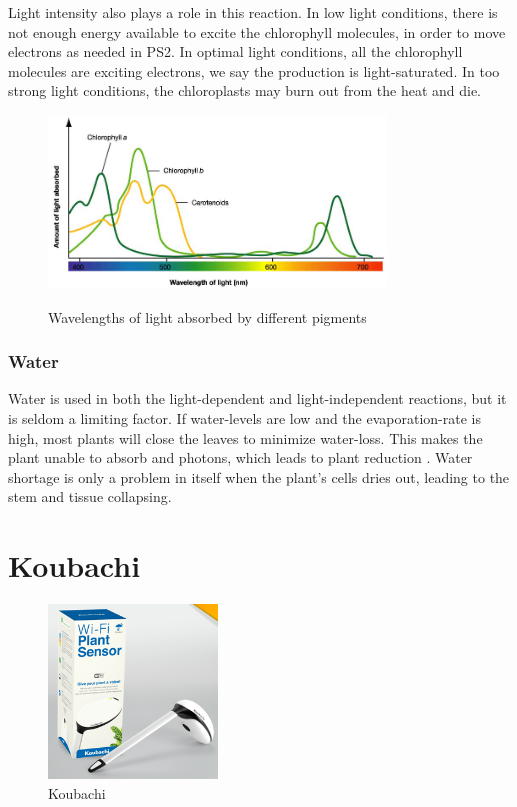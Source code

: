 Light intensity also plays a role in this reaction. In low light conditions, there is not enough energy available to excite the chlorophyll molecules, in order to move electrons as needed in PS2. In optimal light conditions, all the chlorophyll molecules are exciting electrons, we say the production is light-saturated. In too strong light conditions, the chloroplasts may burn out from the heat and die.  

\begin{figure}
        \centering
        \includegraphics[width=0.8\textwidth]{img/photosynthesis/absorption-spectrum.png}
        \caption{Wavelengths of light absorbed by different pigments}
        \citep{uicbiology}
        \label{fig:wavelengthabsorbtion}
\end{figure}

\subsubsection{Water}
Water is used in both the light-dependent and light-independent reactions, but it is seldom a limiting factor. If water-levels are low and the evaporation-rate is high, most plants will close the leaves to minimize water-loss. This makes the plant unable to absorb  and photons, which leads to plant reduction \citep{bi2}. Water shortage is only a problem in itself when the plant's cells dries out, leading to the stem and tissue collapsing. 


\section{Koubachi} %
\begin{figure}
        \centering
        \includegraphics[width=0.4\textwidth]{img/koubachi/sensor.png}
        \caption{Koubachi}
        \label{fig:koubachi}
\end{figure}

